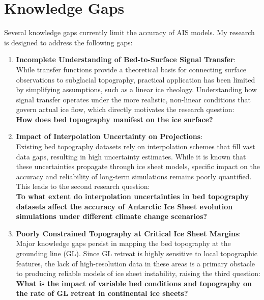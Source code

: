 \section{Knowledge Gaps}
Several knowledge gaps currently limit the accuracy of AIS models. My research is designed to address the following gaps:
\begin{enumerate}
\item{\textbf{Incomplete Understanding of Bed-to-Surface Signal Transfer}}:\\While transfer functions provide a theoretical basis for connecting surface observations to subglacial topography, practical application has been limited by simplifying assumptions, such as a linear ice rheology. Understanding how signal transfer operates under the more realistic, non-linear conditions that govern actual ice flow, which directly motivates the research question:\\
\textbf{How does bed topography manifest on the ice surface?}

\item{\textbf{Impact of Interpolation Uncertainty on Projections}}:\\Existing bed topography datasets rely on interpolation schemes that fill vast data gaps, resulting in high uncertainty estimates. While it is known that these uncertainties propagate through ice sheet models, specific impact on the accuracy and reliability of long-term simulations remains poorly quantified. This leads to the second research question:\\
\textbf{To what extent do interpolation uncertainties in bed topography datasets affect the accuracy of Antarctic Ice Sheet evolution simulations under different climate change scenarios?}

\item{\textbf{Poorly Constrained Topography at Critical Ice Sheet Margins}}:\\Major knowledge gaps persist in mapping the bed topography at the grounding line (GL). Since GL retreat is highly sensitive to local topographic features, the lack of high-resolution data in these areas is a primary obstacle to producing reliable models of ice sheet instability, raising the third question:\\
\textbf{What is the impact of variable bed conditions and topography on the rate of GL retreat in continental ice sheets?}
\end{enumerate}